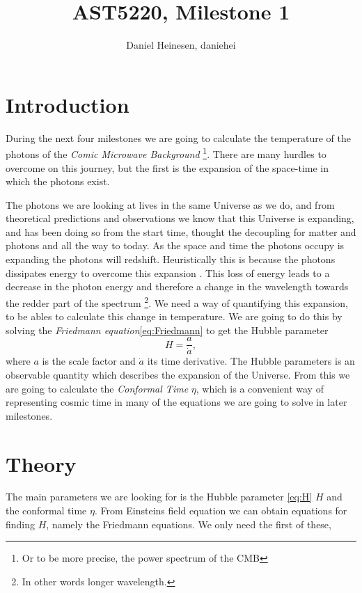 \documentclass[a4paper,norsk, 10pt]{article}
\title{AST5220, Milestone 1}
\author{Daniel Heinesen, daniehei}
\begin{document}
\maketitle

\section{Introduction}
During the next four milestones we are going to calculate the temperature of the photons of the \textit{Comic Microwave Background} \footnote{Or to be more precise, the power spectrum of the CMB}. There are many hurdles to overcome on this journey, but the first is the expansion of the space-time in which the photons exist.

The photons we are looking at lives in the same Universe as we do, and from theoretical predictions and observations we know that this Universe is expanding, and has been doing so from the start time, thought the decoupling for matter and photons and all the way to today. As the space and time the photons occupy is expanding the photons will redshift. Heuristically this is because the photons dissipates energy to overcome this expansion . This loss of energy leads to a decrease in the photon energy and therefore a change in the wavelength towards the redder part of the spectrum \footnote{In other words longer wavelength.}. 
We need a way of quantifying this expansion, to be ables to calculate this change in temperature. We are going to do this by solving the \textit{Friedmann equation}\eqref{eq:Friedmann} to get the Hubble parameter
\begin{equation}\label{eq:H}
H = \frac{a}{\dot{a}},
\end{equation}
where $a$ is the scale factor and $\dot{a}$ its time derivative. The Hubble parameters is an observable quantity which describes the expansion of the Universe. From this we are going to calculate the \textit{Conformal Time} $\eta$, which is a convenient way of representing cosmic time in many of the equations we are going to solve in later milestones.


\section{Theory}

The main parameters we are looking for is the Hubble parameter \eqref{eq:H} $H$ and the conformal time $\eta$. From Einsteins field equation we can obtain equations for finding $H$, namely the Friedmann equations. We only need the first of these,
\end{document}
